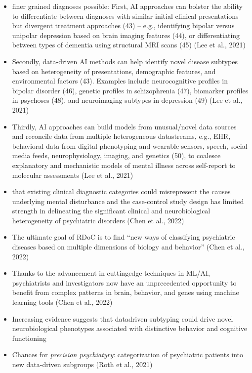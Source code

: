 \documentclass[
  man]{apa7}
\providecommand{\tightlist}{%
  \setlength{\itemsep}{0pt}\setlength{\parskip}{0pt}}
\begin{document}
\begin{itemize}
\tightlist
\item
  finer grained diagnoses possible: First, AI approaches can bolster the ability to differentiate between diagnoses with similar initial clinical presentations but divergent treatment approaches (43) -- e.g., identifying bipolar versus unipolar depression based on brain imaging features (44), or differentiating between types of dementia using structural MRI scans (45) (Lee et al., 2021)
\item
  Secondly, data-driven AI methods can help identify novel disease subtypes based on heterogeneity of presentations, demographic features, and environmental factors (43). Examples include neurocognitive profiles in bipolar disorder (46), genetic profiles in schizophrenia (47), biomarker profiles in psychoses (48), and neuroimaging subtypes in depression (49) (Lee et al., 2021)
\item
  Thirdly, AI approaches can build models from unusual/novel data sources and reconcile data from multiple heterogeneous datastreams, e.g., EHR, behavioral data from digital phenotyping and wearable sensors, speech, social media feeds, neurophysiology, imaging, and genetics (50), to coalesce explanatory and mechanistic models of mental illness across self-report to molecular assessments (Lee et al., 2021)
\item
  that existing clinical diagnostic categories could misrepresent the causes underlying mental disturbance and the case-control study design has limited strength in delineating the significant clinical and neurobiological heterogeneity of psychiatric disorders (Chen et al., 2022)
\item
  The ultimate goal of RDoC is to find ``new ways of classifying psychiatric diseases based on multiple dimensions of biology and behavior'' (Chen et al., 2022)
\item
  Thanks to the advancement in cuttingedge techniques in ML/AI, psychiatrists and investigators now have an unprecedented opportunity to benefit from complex patterns in brain, behavior, and genes using machine learning tools (Chen et al., 2022)
\item
  Increasing evidence suggests that datadriven subtyping could drive novel neurobiological phenotypes associated with distinctive behavior and cognitive functioning
\item
  Chances for \emph{precision psychiatyry}: categorization of psychiatric patients into new data-driven subgroups (Roth et al., 2021)


\end{itemize}
\end{document}

